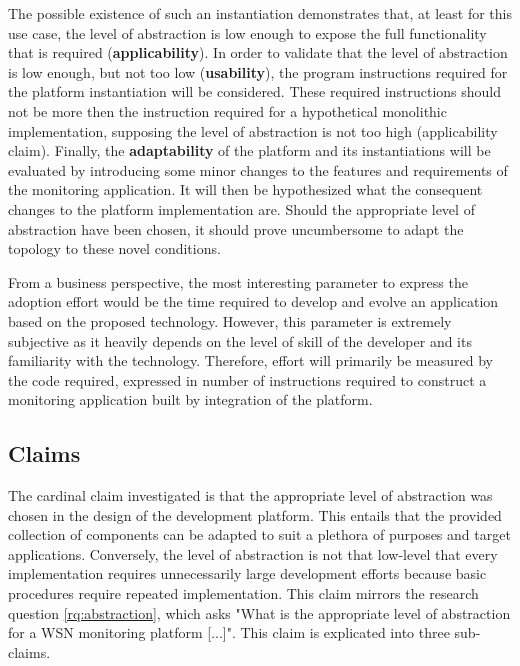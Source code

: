 The possible existence of such an instantiation demonstrates that, at least for this use case, the level of abstraction is low enough to expose the full functionality that is required  (\textbf{applicability}). In order to validate that the level of abstraction is low enough, but not too low (\textbf{usability}), the program instructions required for the platform instantiation will be considered. These required instructions should not be more then the instruction required for a hypothetical monolithic implementation, supposing the level of abstraction is not too high (applicability claim). Finally, the \textbf{adaptability} of the platform and its instantiations will be evaluated by introducing some minor changes to the features and requirements of the monitoring application. It will then be hypothesized what the consequent changes to the platform implementation are. Should the appropriate level of abstraction have been chosen, it should prove uncumbersome to adapt the topology to these novel conditions.

From a business perspective, the most interesting parameter to express the adoption effort would be the time required to develop and evolve an application based on the proposed technology. However, this parameter is extremely subjective as it heavily depends on the level of skill of the developer and its familiarity with the technology. Therefore, effort will primarily be measured by the code required, expressed in number of instructions required to construct a monitoring application built by integration of the platform.

\subsection{Claims}
\label{sec:claims}
The cardinal claim investigated is that the appropriate level of abstraction was chosen in the design of the development platform. This entails that the provided collection of components can be adapted to suit a plethora of purposes and target applications. Conversely, the level of abstraction is not that low-level that every implementation requires unnecessarily large development efforts because basic procedures require repeated implementation. This claim mirrors the research question \ref{rq:abstraction}, which asks "What is the appropriate level of abstraction for a WSN monitoring platform [...]". This claim is explicated into three sub-claims.

